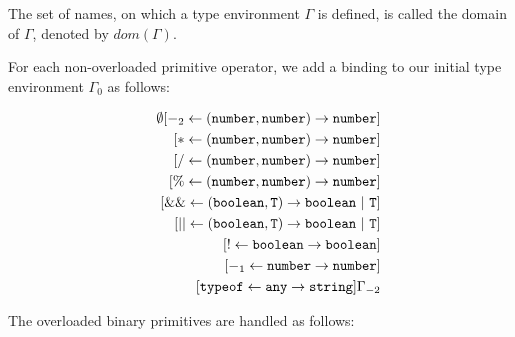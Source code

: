 The set of names, on which a type environment
$\Gamma$ is defined, is called the domain of $\Gamma$, 
denoted by $\textit{dom}(\Gamma)$.

For each non-overloaded primitive operator, we add a binding to our initial
type environment $\Gamma_0$ as follows:

\begin{eqnarray*}
& &
       \emptyset[ -_2 \leftarrow  (\texttt{number}, \texttt{number}) \rightarrow \texttt{number}]\\
&& \hspace{2mm} [ * \leftarrow  (\texttt{number}, \texttt{number}) \rightarrow \texttt{number}]\\
&& \hspace{2mm} [ / \leftarrow  (\texttt{number}, \texttt{number}) \rightarrow \texttt{number}]\\
&& \hspace{2mm} [ \% \leftarrow (\texttt{number}, \texttt{number}) \rightarrow \texttt{number}]\\
&& \hspace{2mm} [ \&\& \leftarrow (\texttt{boolean}, \texttt{T}) \rightarrow \texttt{boolean}\ |\ \texttt{T}]\\
&& \hspace{2mm} [ || \leftarrow   (\texttt{boolean}, \texttt{T}) \rightarrow \texttt{boolean}\ |\ \texttt{T}]\\
&& \hspace{2mm} [ ! \leftarrow \texttt{boolean} \rightarrow \texttt{boolean}]\\
&& \hspace{2mm} [ -_1 \leftarrow \texttt{number} \rightarrow \texttt{number}]\\
&& \hspace{2mm} [ \texttt{typeof} \leftarrow \texttt{any} \rightarrow \texttt{string}]\Gamma_{-2}
\end{eqnarray*}

The overloaded binary primitives are handled as follows:

